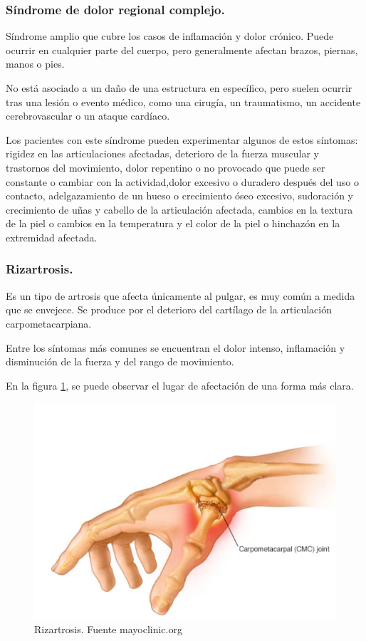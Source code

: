 \subsubsection{Síndrome de dolor regional complejo.}
Síndrome amplio que cubre los casos de inflamación y dolor crónico. Puede ocurrir en cualquier parte del cuerpo, pero generalmente afectan brazos, piernas, manos o pies. 

No está asociado a un daño de una estructura en específico, pero suelen ocurrir tras una lesión o evento médico, como una cirugía, un traumatismo, un accidente cerebrovascular o un ataque cardíaco. 

Los pacientes con este síndrome pueden experimentar algunos de estos síntomas: rigidez en las articulaciones afectadas, deterioro de la fuerza muscular y trastornos del movimiento, dolor repentino o no provocado que puede ser constante o cambiar con la actividad,dolor excesivo o duradero después del uso o contacto, adelgazamiento de un hueso o crecimiento óseo excesivo, sudoración y crecimiento de uñas y cabello de la articulación afectada, cambios en la textura de la piel o cambios en la temperatura y el color de la piel o hinchazón en la extremidad afectada. \cite{sindrome_regional_comple}

\subsubsection{Rizartrosis.}
Es un tipo de artrosis que afecta únicamente al pulgar, es muy común a medida que se envejece. Se produce por el deterioro del cartílago de la articulación carpometacarpiana.

Entre los síntomas más comunes se encuentran el dolor intenso, inflamación y disminución de la fuerza y del rango de movimiento.\cite{artritis_pulgar}

En la figura \ref{fig: Rizartrosis}, se puede observar el lugar de afectación de una forma más clara.

\begin{figure}
    \centering
    \includegraphics[width=0.5\linewidth]{img/Rizartrosis.png}
    \caption{Rizartrosis. Fuente mayoclinic.org}
    \label{fig: Rizartrosis}
\end{figure}
